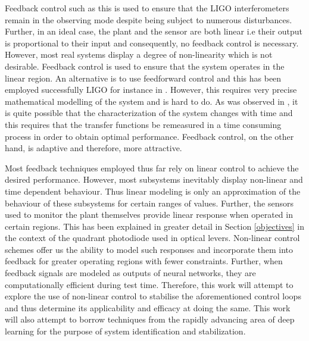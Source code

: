 \documentclass[colorlinks=true,pdfstartview=FitV,linkcolor=blue,
            citecolor=red,urlcolor=magenta]{ligodoc}
\begin{document}
Feedback control such as this is used to ensure that the LIGO interferometers remain in the observing mode despite being subject to numerous disturbances. Further, in an ideal case, the plant and the sensor are both linear i.e their output is proportional to their input and consequently, no feedback control is necessary. However, most real systems display a degree of non-linearity which is not desirable. Feedback control is used to ensure that the system operates in the linear region. An alternative is to use feedforward control and this has been employed successfully LIGO for instance in \cite{feedforward}. However, this requires very precise mathematical modelling of the system and is hard to do. As was observed in \cite{feedforward}, it is quite possible that the characterization of the system changes with time and this requires that the transfer functions be remeasured in a time consuming process in order to obtain optimal performance. Feedback control, on the other hand, is adaptive and therefore, more attractive. 


Most feedback techniques employed thus far rely on linear control to achieve the desired performance. However, most subsystems inevitably display non-linear and time dependent behaviour. Thus linear modeling is only an approximation of the behaviour of these subsystems for certain ranges of values. Further, the sensors used to monitor the plant themselves provide linear response when operated in certain regions. This has been explained in greater detail in Section 
\ref{objectives} in the context of the quadrant photodiode used in optical levers. Non-linear control schemes offer us the ability to model such responses and incorporate them into feedback for greater operating regions with fewer constraints. Further, when feedback signals are modeled as outputs of neural networks, they are computationally efficient during test time. Therefore, this work will attempt to explore the use of non-linear control to stabilise the aforementioned control loops and thus determine its applicability and efficacy at doing the same. This work will also attempt to borrow techniques from the rapidly advancing area of deep learning for the purpose of system identification and stabilization.   






\end{document}
